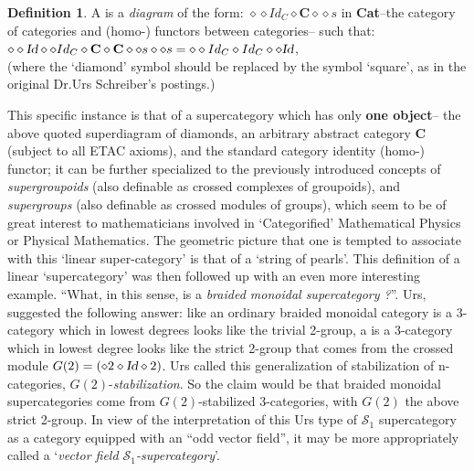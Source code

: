 \documentclass[12pt]{article}
\theoremstyle{plain}
\theoremstyle{definition}
\newtheorem{definition}{Definition}[section]
\numberwithin{equation}{section}
\begin{document}
\begin{definition}
A  is a \emph{diagram} of the form:
$\diamond  \diamond Id_C \diamond \textbf{C} \diamond \diamond s$ in \textbf{Cat}--the category of categories and (homo-) functors between categories-- such that: $\diamond  \diamond \textsl{Id} \diamond \diamond Id_C \diamond \textbf{C} \diamond \textbf{C}\diamond \diamond s \diamond \diamond s = \diamond  \diamond Id_C \diamond Id_C  \diamond  \diamond \textsl{Id}$, \\
(where the `diamond' symbol should be replaced by the symbol `square', as in the original Dr.Urs Schreiber's postings.) 
\end{definition} 
This specific instance is that of a supercategory which has only \textbf{one object}-- the above quoted superdiagram of diamonds, an arbitrary abstract category \textbf{C} (subject to all ETAC axioms), and the standard category identity (homo-) functor; it can be further specialized to the previously introduced concepts of \textit{supergroupoids} (also definable as crossed complexes of groupoids), and \textit{supergroups} (also definable as crossed modules of groups), which seem to be of great interest to mathematicians involved in `Categorified' Mathematical Physics or Physical Mathematics. The geometric picture that one is tempted to associate with this `linear super-category' is that of
a `string of pearls'.  This definition of a linear `supercategory' was then followed up with an even more interesting example. ``What, in this sense, is a \textit{braided monoidal supercategory ?}''.  Urs, suggested the following answer: like an ordinary braided monoidal category is a 3-category which in lowest degrees looks like the trivial 2-group, a 
 is a 3-category which in lowest degree looks like the strict 2-group that comes from 
the crossed module $G(2)=(\diamond 2 \diamond \textsl{Id} \diamond 2)$. Urs called this generalization of stabilization of n-categories, $G(2)$-\textit{stabilization}. So the claim would be that braided monoidal supercategories come from 
$G(2)$-stabilized 3-categories, with $G(2)$ the above strict 2-group. In view of the interpretation of this Urs type
of $\mathcal{S}_1$ supercategory as a category equipped with an ``odd vector field'', it may be more appropriately called a `\emph{vector field $\mathcal{S}_1$-supercategory}'.
\end{document}
